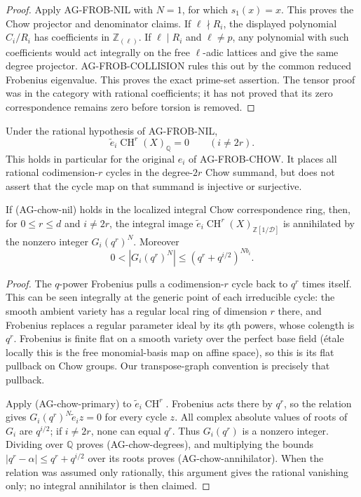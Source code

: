 \begin{proof}
Apply AG-FROB-NIL with $N=1$, for which $s_1(x)=x$.
This proves the Chow projector and denominator
claims.  If $\ell\nmid R_i$, the displayed polynomial
$C_i/R_i$ has coefficients in $\mathbb Z_{(\ell)}$.
If $\ell\mid R_i$ and $\ell\ne p$, any polynomial
with such coefficients would act integrally on the
free $\ell$-adic lattices and give the same degree
projector.  AG-FROB-COLLISION rules this out by the
common reduced Frobenius eigenvalue.  This proves
the exact prime-set assertion.  The tensor proof
was in the category with rational coefficients;
it has not proved that its zero correspondence
remains zero before torsion is removed.
\end{proof}

\begin{proposition}
Under the rational hypothesis of AG-FROB-NIL,
\[
      \widetilde e_i\operatorname{CH}^r(X)_{\mathbb Q}=0
                         \qquad(i\ne2r).
\tag{AG-chow-degrees}
\]
This holds in particular for the original $e_i$ of
AG-FROB-CHOW.  It places all rational codimension-$r$
cycles in the degree-$2r$ Chow summand, but does not
assert that the cycle map on that summand is injective
or surjective.

If (AG-chow-nil) holds in the localized integral
Chow correspondence ring, then, for $0\le r\le d$
and $i\ne2r$, the integral image
$\widetilde e_i\operatorname{CH}^r(X)_{\mathbb Z[1/\mathcal D]}$
is annihilated by the nonzero integer
$G_i(q^r)^N$.  Moreover
\[
       0<|G_i(q^r)^N|
                      \le(q^r+q^{i/2})^{Nb_i}.
\tag{AG-chow-annihilator}
\]
\end{proposition}
\begin{proof}
The $q$-power Frobenius pulls a codimension-$r$
cycle back to $q^r$ times itself.  This can be seen
integrally at the generic point of each irreducible
cycle: the smooth ambient variety has a regular
local ring of dimension $r$ there, and Frobenius
replaces a regular parameter ideal by its $q$th
powers, whose colength is $q^r$.  Frobenius is
finite flat on a smooth variety over the perfect
base field (étale locally this is the free
monomial-basis map on affine space), so this is its
flat pullback on Chow groups.  Our transpose-graph
convention is precisely that pullback.

Apply (AG-chow-primary) to
$\widetilde e_i\operatorname{CH}^r$.
Frobenius acts there by $q^r$, so the relation gives
$G_i(q^r)^N\widetilde e_i z=0$ for every cycle $z$.
All complex absolute values of roots of $G_i$ are
$q^{i/2}$; if $i\ne2r$, none can equal $q^r$.
Thus $G_i(q^r)$ is a nonzero integer.  Dividing
over $\mathbb Q$ proves (AG-chow-degrees), and
multiplying the bounds
$|q^r-\alpha|\le q^r+q^{i/2}$ over its roots proves
(AG-chow-annihilator).  When the relation was assumed
only rationally, this argument gives the rational
vanishing only; no integral annihilator is then claimed.
\end{proof}

